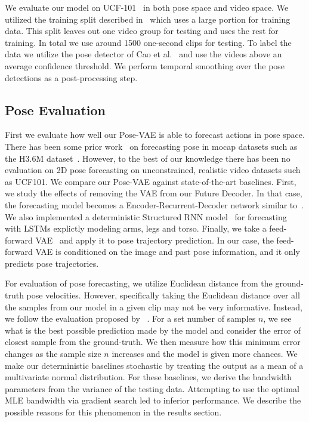 We evaluate our model on UCF-101~\cite{Soomro12} in both pose space and video space. We utilized the training split described in~\cite{Walker15} which uses a large portion for training data. This split leaves out one video group for testing and uses the rest for training. In total we use around 1500 one-second clips for testing. To label the data we utilize the pose detector of Cao et al.~\cite{Cao17} and use the videos above an average confidence threshold. We perform temporal smoothing over the pose detections as a post-processing step.

\subsection{Pose Evaluation}

First we evaluate how well our Pose-VAE is able to forecast actions in pose space. There has been some prior work~\cite{Fragikiadaki15, Jain16} on forecasting pose in mocap datasets such as the H3.6M dataset~\cite{Ionescu14}. However, to the best of our knowledge there has been no evaluation on 2D pose forecasting on unconstrained, realistic video datasets such as UCF101. We compare our Pose-VAE against state-of-the-art baselines. First, we study the effects of removing the VAE from our Future Decoder. In that case, the forecasting model becomes a Encoder-Recurrent-Decoder network similar to~\cite{Fragikiadaki15}. We also implemented a deterministic Structured RNN model~\cite{Jain16} for forecasting with LSTMs explictly modeling arms, legs and torso.
Finally, we take a feed-forward VAE~\cite{Walker16} and apply it to pose trajectory prediction. In our case, the feed-forward VAE is conditioned on the image and past pose information, and it only predicts pose trajectories. 

 For evaluation of pose forecasting, we utilize Euclidean distance from the ground-truth pose velocities. However, specifically taking the Euclidean distance over all the samples from our model in a given clip may not be very informative. Instead, we follow the evaluation proposed by ~\cite{Walker16}. For a set number of samples $n$, we see what is the best possible prediction made by the model and consider the error of closest sample from the ground-truth. We then measure how this minimum error changes as the sample size $n$ increases and the model is given more chances. We make our deterministic baselines stochastic by treating the output as a mean of a multivariate normal distribution. For these baselines, we derive the bandwidth parameters from the variance of the testing data. Attempting to use the optimal MLE bandwidth via gradient search led to inferior performance. We describe the possible reasons for this phenomenon in the results section.  

